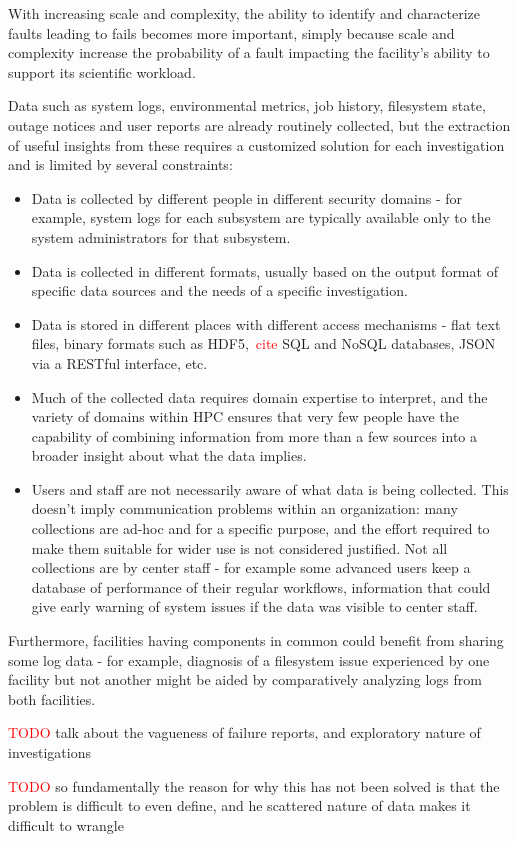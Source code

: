 With increasing scale and complexity, the ability to identify and characterize 
faults leading to fails becomes more important, simply because scale and 
complexity increase the probability of a fault impacting the facility's ability
to support its scientific workload. 

Data such as system logs, environmental metrics, job history, filesystem state,
outage notices and user reports are already routinely collected, but the 
extraction of useful insights from these requires a customized solution for 
each investigation and is limited by several constraints:

\begin{itemize}
\item Data is collected by different people in different security domains - for
      example, system logs for each subsystem are typically available only to 
      the system administrators for that subsystem. 
\item Data is collected in different formats, usually based on the output format
      of specific data sources and the needs of a specific investigation.
\item Data is stored in different places with different access mechanisms - flat 
      text files, binary formats such as HDF5,~\textcolor{red}{cite} SQL and 
      NoSQL databases, JSON via a RESTful interface, etc.
\item Much of the collected data requires domain expertise to interpret, and the
      variety of domains within HPC ensures that very few people have the 
      capability of combining information from more than a few sources into a
      broader insight about what the data implies.
\item Users and staff are not necessarily aware of what data is being collected.
      This doesn't imply communication problems within an organization: many 
      collections are ad-hoc and for a specific purpose, and the effort required 
      to make them suitable for wider use is not considered justified. Not all 
      collections are by center staff - for example some advanced users keep
      a database of performance of their regular workflows, information that 
      could give early warning of system issues if the data was visible to 
      center staff.
\end{itemize}

Furthermore, facilities having components in common could benefit from sharing 
some log data - for example, diagnosis of a filesystem issue experienced by one 
facility but not another might be aided by comparatively analyzing logs from 
both facilities.

\textcolor{red}{TODO} talk about the vagueness of failure reports, and 
exploratory nature of investigations

\textcolor{red}{TODO} so fundamentally the reason for why this has not been 
solved is that the problem is difficult to even define, and he scattered nature
of data makes it difficult to wrangle


